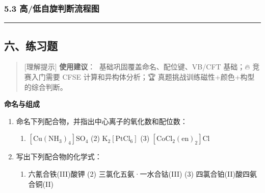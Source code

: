\subsubsection{5.3 高/低自旋判断流程图}\label{ux9ad8ux4f4eux81eaux65cbux5224ux65adux6d41ux7a0bux56fe}

\begin{Shaded}
\begin{Highlighting}[]
\end{Highlighting}
\end{Shaded}

\begin{center}\rule{0.5\linewidth}{0.5pt}\end{center}

\subsection{六、练习题}\label{ux516dux7ec3ux4e60ux9898}

\begin{quote}
{[}理解提示{]} \textbf{使用建议}：🌱 基础巩固覆盖命名、配位键、VB/CFT 基础；🔥 竞赛入门需要 CFSE 计算和异构体分析；🏆 真题挑战训练磁性+颜色+构型的综合判断。
\end{quote}

\textbf{命名与组成}

\begin{enumerate}
\def\labelenumi{\arabic{enumi}.}
\tightlist
\item
  命名下列配合物，并指出中心离子的氧化数和配位数：

  \begin{enumerate}
  \def\labelenumii{(\arabic{enumii})}
  \tightlist
  \item
    \(\mathrm{[Cu(NH_3)_4]SO_4}\) (2) \(\mathrm{K_2[PtCl_6]}\) (3) \(\mathrm{[CoCl_2(en)_2]Cl}\)
  \end{enumerate}
\item
  写出下列配合物的化学式：

  \begin{enumerate}
  \def\labelenumii{(\arabic{enumii})}
  \tightlist
  \item
    六氰合铁(III)酸钾 (2) 三氯化五氨·一水合钴(III) (3) 四氯合铂(II)酸四氨合铜(II)
  \end{enumerate}
\end{enumerate}

